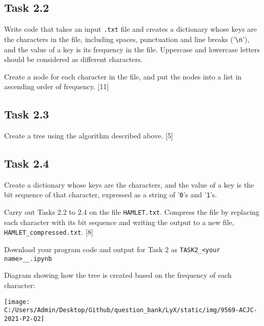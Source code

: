 \subsection*{Task 2.2}

\noindent Write code that takes an input \texttt{.txt} file and creates
a dictionary whose keys are the characters in the file, including
spaces, punctuation and line breaks ('\texttt{\textbackslash n}'),
and the value of a key is its frequency in the file. Uppercase and
lowercase letters should be considered as different characters.

\noindent Create a node for each character in the file, and put the
nodes into a list in ascending order of frequency. \hfill{}{[}11{]}

\subsection*{Task 2.3}

\noindent Create a tree using the algorithm described above. \hfill{}{[}5{]}

\subsection*{Task 2.4}

\noindent Create a dictionary whose keys are the characters, and the
value of a key is the bit sequence of that character, expressed as
a string of '\texttt{0}'s and '\texttt{1}'s.

\noindent Carry out Tasks 2.2 to 2.4 on the file \texttt{HAMLET.txt}.
Compress the file by replacing each character with its bit sequence
and writing the output to a new file, \texttt{HAMLET\_compressed.txt}.
{[}8{]}

\noindent Download your program code and output for Task 2 as \texttt{TASK2\_<your
name>\_<centre number>\_<index number>.ipynb} 

\noindent Diagram showing how the tree is created based on the frequency
of each character: 
\noindent \begin{center}
\texttt{[image: C:/Users/Admin/Desktop/Github/question\_bank/LyX/static/img/9569-ACJC-2021-P2-Q2]}\quad{}
\par\end{center}